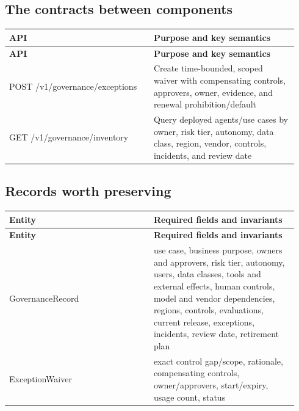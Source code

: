 \subsection{The contracts between components}

\BookTableStart
\small
\begin{longtable}{@{}Y{0.4700\linewidth}Y{0.4700\linewidth}@{}}
\color{white}\bfseries \textbf{API} & \color{white}\bfseries \textbf{Purpose and key semantics} \\
\endfirsthead
{}
\color{white}\bfseries \textbf{API} & \color{white}\bfseries \textbf{Purpose and key semantics} \\
\endhead
POST /v1/governance/exceptions & Create time-bounded, scoped waiver with compensating controls, approvers, owner, evidence, and renewal prohibition/default \\
GET /v1/governance/inventory & Query deployed agents/use cases by owner, risk tier, autonomy, data class, region, vendor, controls, incidents, and review date \\
\end{longtable}
\BookTableEnd

\subsection{Records worth preserving}

\BookTableStart
\small
\begin{longtable}{@{}Y{0.4700\linewidth}Y{0.4700\linewidth}@{}}
\color{white}\bfseries \textbf{Entity} & \color{white}\bfseries \textbf{Required fields and invariants} \\
\endfirsthead
{}
\color{white}\bfseries \textbf{Entity} & \color{white}\bfseries \textbf{Required fields and invariants} \\
\endhead
GovernanceRecord & use case, business purpose, owners and approvers, risk tier, autonomy, users, data classes, tools and external effects, human controls, model and vendor dependencies, regions, controls, evaluations, current release, exceptions, incidents, review date, retirement plan \\
ExceptionWaiver & exact control gap/scope, rationale, compensating controls, owner/approvers, start/expiry, usage count, status \\
\end{longtable}
\BookTableEnd

